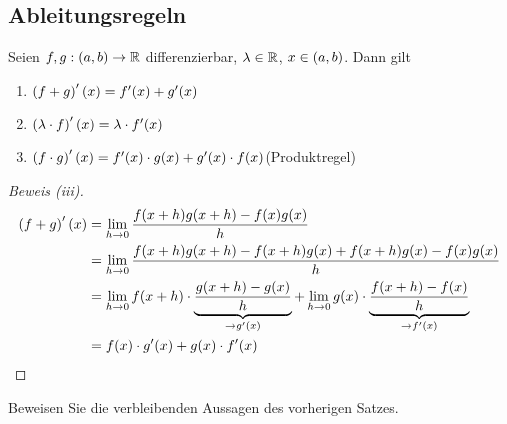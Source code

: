 \subsection{Ableitungsregeln}

\begin{satz} %
    \label{satz:ableitungsregeln}
    Seien $f, g: (a,b)\rightarrow{} \mathbb{R}$ differenzierbar, $\lambda\in\mathbb{R}$, $x\in\left(a,b\right)$. Dann gilt
    \begin{enumerate}[label=(\roman*)]
        \item $\pair{f+g}'\of{x} = f'(x)+g'(x)$
        \item $\pair{\lambda\cdot f}'\of{x} = \lambda\cdot f'(x)$
        \item $\pair{f\cdot g}'\of{x} = f'(x)\cdot g(x) + g'(x)\cdot f(x)$\quad\quad(Produktregel)
    \end{enumerate}
    \begin{proof}[Beweis (iii)]
        \begin{align*}
            \pair{f+g}'\of{x} &= \lim_{h\fromto 0} \frac{f(x+h)g(x+h) - f(x)g(x)}{h}\\
            &= \lim_{h\fromto 0} \frac{f(x+h)g(x+h) - f(x+h)g(x) + f(x+h)g(x) - f(x)g(x)}{h}\\
            &= \lim_{h\fromto 0} f(x+h)\cdot \underbrace{\frac{g(x+h)-g(x)}{h}}_{\fromto g'(x)} + \lim_{h\fromto 0} g(x) \cdot \underbrace{\frac{f(x+h)-f(x)}{h}}_{\fromto f'(x)}\\
            &= f(x) \cdot g'(x) + g(x)\cdot f'(x)\qedhere
        \end{align*}
    \end{proof}
\end{satz}

\begin{uebung}
    Beweisen Sie die verbleibenden Aussagen des vorherigen Satzes.
\end{uebung}

